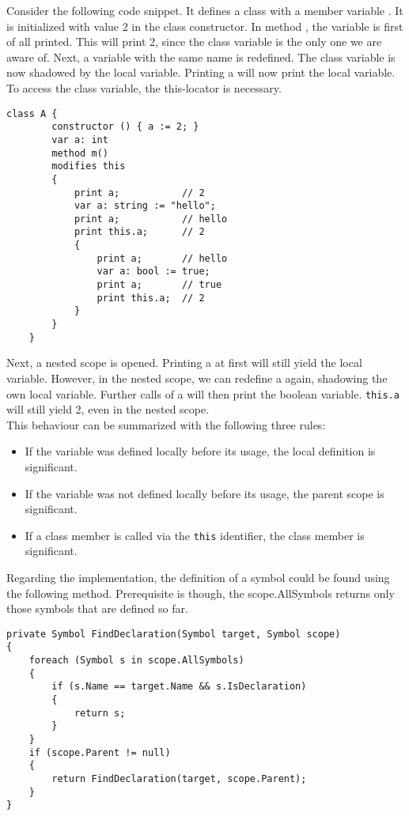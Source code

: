 Consider the following code snippet. It defines a class with a member variable . It is initialized with value 2 in the class constructor. In method , the variable  is first of all printed. This will print 2, since the class variable is the only one we are aware of. Next, a variable with the same name is redefined. The class variable is now shadowed by the local variable. Printing a will now print the local variable. To access the class variable, the this-locator is necessary.

\begin{lstlisting}[caption={Complex Shadowing Example}, captionpos=b, label={lst:shadowing}]
    class A {
        constructor () { a := 2; }
        var a: int
        method m()
        modifies this
        {
            print a;           // 2
            var a: string := "hello";
            print a;           // hello
            print this.a;      // 2
            {
                print a;       // hello
                var a: bool := true;
                print a;       // true
                print this.a;  // 2
            }
        }
    }
\end{lstlisting}

Next, a nested scope is opened. Printing a at first will still yield the local variable. However, in the nested scope, we can redefine a again, shadowing the own local variable. Further calls of a will then print the boolean variable. \texttt{this.a} will still yield 2, even in the nested scope.\\

This behaviour can be summarized with the following three rules:
\begin{itemize}
    \item If the variable was defined locally before its usage, the local definition is significant.
    \item If the variable was not defined locally before its usage, the parent scope is significant.
    \item If a class member is called via the \texttt{this} identifier, the class member is significant.
\end{itemize}

Regarding the implementation, the definition of a symbol could be found using the following method. Prerequisite is though, the scope.AllSymbols returns only those symbols that are defined so far.

\lstset{style=sharpc}
\begin{lstlisting}[caption={Finding Symbol Definition}, captionpos=b, label={lst:findsymbol}]
private Symbol FindDeclaration(Symbol target, Symbol scope)
{
    foreach (Symbol s in scope.AllSymbols)
    {
        if (s.Name == target.Name && s.IsDeclaration)
        {
            return s;
        }
    }
    if (scope.Parent != null)
    {
        return FindDeclaration(target, scope.Parent);
    }
}
\end{lstlisting}

